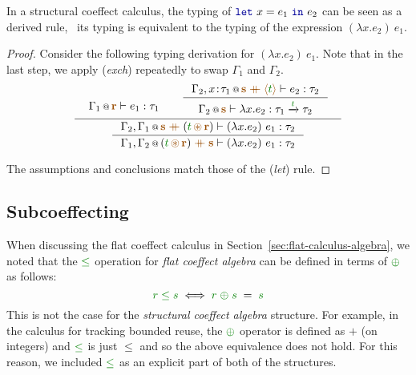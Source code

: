\begin{proposition}
\label{thm:structural-letbinding}
In a structural coeffect calculus, the typing of $\kvd{let}~x=e_1~\kvd{in}~e_2$ can be
seen as a derived rule, \ie~its typing is equivalent to the typing of the expression
$(\lambda x.e_2)~e_1$.
\end{proposition}
\begin{proof}
Consider the following typing derivation for $(\lambda x.e_2)~e_1$. Note that
in the last step, we apply (\emph{exch}) repeatedly to swap $\Gamma_1$ and $\Gamma_2$.
%
\begin{equation*}
\inference
  { \begin{array}{l}\coctx{\Gamma_1}{\aclrd{\textbf{r}}} \vdash e_1 : \tau_1\vspace{-1.6em}\end{array} &
    \inference
      { \coctx{\Gamma_2, x\!:\!\tau_1}{\aclrd{\textbf{s}}\;\atimes\;\alift{\cclrd{t}}} \vdash e_2 : \tau_2 }
      { \coctx{\Gamma_2}{\aclrd{\textbf{s}}} \vdash \lambda x.e_2 : \tau_1 \xrightarrow{\cclrd{t}} \tau_2} \vspace{0.2em} }
  { \inference
      { \coctx{\Gamma_2, \Gamma_1}{\aclrd{\textbf{s}} \;\atimes\; (\cclrd{t} \,\aseq\, \aclrd{\textbf{r}})} \vdash (\lambda x.e_2)~e_1 : \tau_2 }
      { \coctx{\Gamma_1, \Gamma_2}{(\cclrd{t} \,\aseq\, \aclrd{\textbf{r}}) \;\atimes\;  \aclrd{\textbf{s}} } \vdash (\lambda x.e_2)~e_1 : \tau_2 } }
\end{equation*}

\noindent
The assumptions and conclusions match those of the (\emph{let}) rule.
\end{proof}


\subsection{Subcoeffecting}
\label{sec:structural-exts-sub}

When discussing the flat coeffect calculus in Section~\ref{sec:flat-calculus-algebra}, we noted
that the $\cleq$ operation for \emph{flat coeffect algebra} can be defined in terms of $\cpar$
as follows:
%
\begin{equation*}
\cclrd{r} \;\cleq\; \cclrd{s} \;\Longleftrightarrow\; \cclrd{r} \;\cpar\; \cclrd{s} \;=\; \cclrd{s}
\end{equation*}
%
This is not the case for the \emph{structural coeffect algebra} structure. For example, in the
calculus for tracking bounded reuse, the $\cpar$ operator is defined as $+$ (on integers) and
$\cleq$ is just $\leq$ and so the above equivalence does not hold. For this reason, we included
$\cleq$ as an explicit part of both of the structures.


